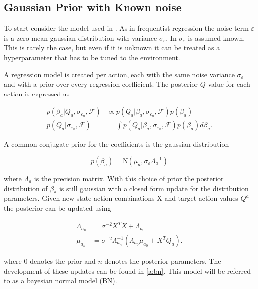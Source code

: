 \subsection{Gaussian Prior with Known noise}

To start consider the model used in \cite{azziz_2018}. As in frequentist regression the noise term $\varepsilon$ is a zero mean gaussian distribution with variance $\sigma_\varepsilon$. In \cite{azziz_2018} $\sigma_\varepsilon$ is assumed known. This is rarely the case, but even if it is unknown it can be treated as a hyperparameter that has to be tuned to the environment. 

A regression model is created per action, each with the same noise variance $\sigma_\varepsilon$ and with a prior over every regression coefficient. The posterior $Q$-value for each action is expressed as 

\begin{align*}
    p(\beta_a |Q_a, \sigma_{\varepsilon_a}, \mathcal{F}) &\propto p(Q_a| \beta_a, \sigma_{\varepsilon_a}, \mathcal{F})p(\beta_a) \\
    p(Q_a|\sigma_{\varepsilon_a}, \mathcal{F}) &= \int p(Q_a|\beta_a, \sigma_{\varepsilon_a}, \mathcal{F}) p(\beta_a)d\beta_a.
\end{align*}

A common conjugate prior for the coefficients is the gaussian distribution 

$$
p(\beta_a) = \text{N}(\mu_a, \sigma_\varepsilon\Lambda_a^{-1}) 
$$

where $\Lambda_a$ is the precision matrix. With this choice of prior the posterior distribution of $\beta_a$ is still gaussian with a closed form update for the distribution parameters. Given new state-action combinations X and target action-values $Q^a$ the posterior can be updated using 

\begin{equation}
    \begin{split}
        \label{eq:known_noise_posterior_update}
        \Lambda_{a_n} & = \sigma^{-2}X^TX + \Lambda_{a_0} \\
        \mu_{a_n}     & = \sigma^{-2}\Lambda_{a_n}^{-1}(\Lambda_{a_0}\mu_{a_0} + X^TQ_a).
    \end{split}
\end{equation}

where $0$ denotes the prior and $n$ denotes the posterior parameters. The development of these updates can be found in \ref{a:bn}. This model will be referred to as a bayesian normal model (BN).

